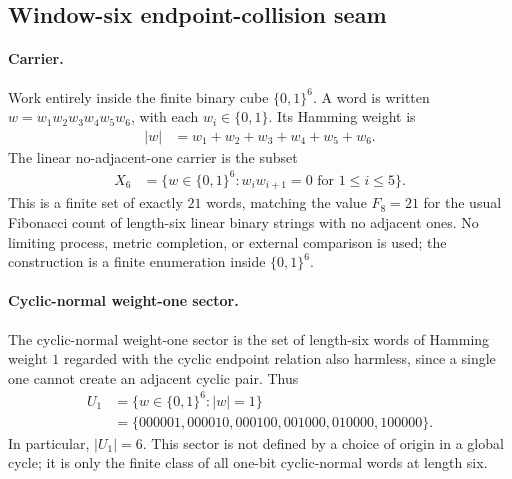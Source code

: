 
\subsection{Window-six endpoint-collision seam}
\label{sec:window6-edge-cokernel-clock-seam-identification}

\paragraph{Carrier.}
Work entirely inside the finite binary cube $\{0,1\}^6$.  A word is written $w=w_1w_2w_3w_4w_5w_6$, with each $w_i\in\{0,1\}$.  Its Hamming weight is
$$
\begin{aligned}
|w|&=w_1+w_2+w_3+w_4+w_5+w_6.
\end{aligned}
$$
The linear no-adjacent-one carrier is the subset
$$
\begin{aligned}
X_6
&=\{w\in\{0,1\}^6: w_iw_{i+1}=0\text{ for }1\leq i\leq 5\}.
\end{aligned}
$$
This is a finite set of exactly $21$ words, matching the value $F_8=21$ for the usual Fibonacci count of length-six linear binary strings with no adjacent ones.  No limiting process, metric completion, or external comparison is used; the construction is a finite enumeration inside $\{0,1\}^6$.

\paragraph{Cyclic-normal weight-one sector.}
The cyclic-normal weight-one sector is the set of length-six words of Hamming weight $1$ regarded with the cyclic endpoint relation also harmless, since a single one cannot create an adjacent cyclic pair.  Thus
$$
\begin{aligned}
U_1
&=\{w\in\{0,1\}^6: |w|=1\}\\
&=\{000001,000010,000100,001000,010000,100000\}.
\end{aligned}
$$
In particular, $|U_1|=6$.  This sector is not defined by a choice of origin in a global cycle; it is only the finite class of all one-bit cyclic-normal words at length six.


